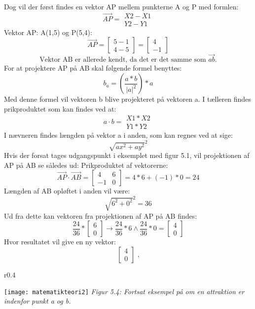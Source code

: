 Dog vil der først findes en vektor AP mellem punkterne A og P med formlen: \[ \overrightarrow{AP} = \begin{matrix}X2-X1 \\ Y2-Y1\end{matrix} \]
Vektor AP: A(1,5) og P(5,4): \[ \overrightarrow{AP} = \begin{bmatrix}5-1 \\ 4-5\end{bmatrix} = \begin{bmatrix} 4 \\ -1 \end{bmatrix} \]
\[ \text{Vektor AB er allerede kendt, da det er det samme som } \overrightarrow{ab} \text{.} \]
For at projektere AP på AB skal følgende formel benyttes: \citep{ProjektionAfVektor} \[ b_{a} = (\frac{a*b}{|a|^2}) * a \]
Med denne formel vil vektoren b blive projekteret på vektoren a. I tælleren findes prikproduktet som kan findes ved at: \[ a \cdot b = \begin{matrix}X1 * X2 \\ Y1 * Y2\end{matrix}  \]
I nævneren findes længden på vektor a i anden, som kan regnes ved at sige: \[ \sqrt{ax^2+ay^2}^2 \]
Hvis der forsat tages udgangspunkt i eksemplet med figur 5.1, vil projektionen af AP på AB se således ud:
Prikproduktet af vektorerne: \[ \overrightarrow{AP} \cdot \overrightarrow{AB} = \begin{bmatrix} 4 & 6 \\ -1 & 0 \end{bmatrix} = 4*6+(-1)*0 = 24 \]
Længden af AB opløftet i anden vil være: \[ \sqrt{6^2+0^2}^2 = 36 \]
Ud fra dette kan vektoren fra projektionen af AP på AB findes: 
\[ \frac{24}{36} * \begin{bmatrix} 6 \\ 0 \end{bmatrix} \rightarrow \frac{24}{36} * 6 \wedge \frac{24}{36} * 0 = \begin{bmatrix} 4 \\ 0 \end{bmatrix} \]
Hvor resultatet vil give en ny vektor: \[ \begin{bmatrix} 4 \\ 0 \end{bmatrix} \text{ ,} \] 
\begin{wrapfigure}{r}{0.4\textwidth}
	\vspace{0pt}
	\begin{center}
		\texttt{[image: matematikteori2]} \newline
		\textit{Figur 5.4: Fortsat eksempel på om en attraktion er indenfor punkt a og b.}\newline
	\end{center}
	\vspace{-20pt}
\end{wrapfigure}
